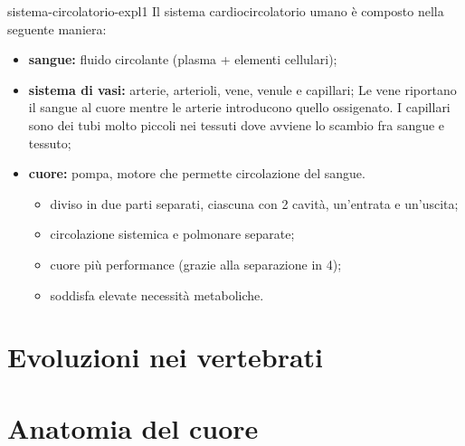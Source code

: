 \documentclass[preview]{standalone}
\begin{document}
\begin{snippet}{sistema-circolatorio-expl1}
    Il sistema cardiocircolatorio umano è composto nella seguente maniera:
    \begin{itemize}
        \item \textbf{sangue:} fluido circolante (plasma + elementi cellulari);
        \item \textbf{sistema di vasi:} arterie, arterioli, vene, venule e capillari;
            Le vene riportano il sangue al cuore mentre le arterie introducono quello ossigenato.
            I capillari sono dei tubi molto piccoli nei tessuti dove avviene lo scambio fra sangue e tessuto;
        \item \textbf{cuore:} pompa, motore che permette circolazione del sangue.
            \begin{itemize}
                \item diviso in due parti separati, ciascuna con 2 cavità, un'entrata e un'uscita;
                \item circolazione sistemica e polmonare separate;
                \item cuore più performance (grazie alla separazione in 4);
                \item soddisfa elevate necessità metaboliche.
            \end{itemize}
    \end{itemize}
\end{snippet}



\section{Evoluzioni nei vertebrati}


\section{Anatomia del cuore}

\end{document}
